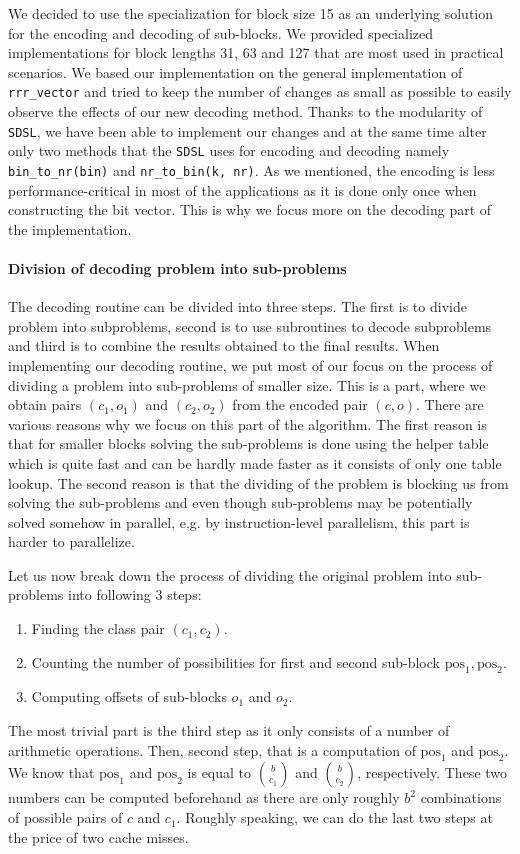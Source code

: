 We decided to use the specialization for block size 15 as an underlying solution for the encoding and
decoding of sub-blocks. We provided specialized implementations for block lengths 31, 63 and 127 that
are most used in practical scenarios. We based our implementation on the general implementation of
\verb'rrr_vector' and tried to keep the number of changes as small as possible to easily observe the
effects of our new decoding method. Thanks to the modularity of \texttt{SDSL}, we have been able to
implement our changes and at the same time alter only two methods that the \texttt{SDSL} uses for
encoding and decoding namely \verb'bin_to_nr(bin)' and \verb'nr_to_bin(k, nr)'. As we mentioned,
the encoding is less performance-critical in most of the applications as it is done only once when
constructing the bit vector. This is why we focus more on the decoding part of the implementation.

\paragraph{Division of decoding problem into sub-problems}

The decoding routine can be divided into three steps. The first is to divide problem into subproblems,
second is to use subroutines to decode subproblems and third is to combine the results obtained to the final
results. When implementing our decoding routine, we put most of our focus on the process of dividing
a problem into sub-problems of smaller size. This is a part, where we obtain pairs $(c_1, o_1)$ and $(c_2, o_2)$
from the encoded pair $(c, o)$. There are various reasons why we focus on this part of the algorithm.
The first reason is that for smaller blocks solving the sub-problems is done using the helper table
which is quite fast and can be hardly made faster as it consists of only one table lookup. The second
reason is that the dividing of the problem is blocking us from solving the sub-problems and even though
sub-problems may be potentially solved somehow in parallel, e.g. by instruction-level parallelism, this
part is harder to parallelize.

Let us now break down the process of dividing the original problem into sub-problems into following 3 steps:
\begin{enumerate}
	\item Finding the class pair $(c_1, c_2)$.
	\item Counting the number of possibilities for first and second sub-block $\text{pos}_1, \text{pos}_2$.
	\item Computing offsets of sub-blocks $o_1$ and $o_2$.
\end{enumerate}
The most trivial part is the third step as it only consists of a number of arithmetic operations. Then,
second step, that is a computation of $\text{pos}_1$ and $\text{pos}_2$. We know that $\text{pos}_1$
and $\text{pos}_2$ is equal to ${b\choose c_1}$ and ${b\choose c_2}$, respectively. These two numbers
can be computed beforehand as there are only roughly $b^2$ combinations of possible pairs of $c$ and $c_1$.
Roughly speaking, we can do the last two steps at the price of two cache misses.

